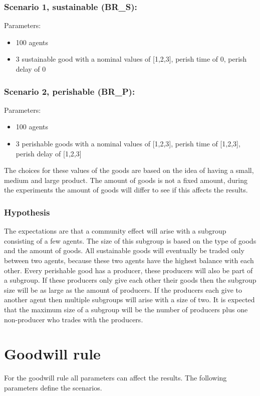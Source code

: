 \documentclass[twoside,openright]{uva-bachelor-thesis}
\begin{document}
\subsubsection{Scenario 1, sustainable (BR\_S):}
Parameters:
\begin{itemize}
\item	100 agents
\item	3 sustainable good with a nominal values of [1,2,3], perish time of 0, perish delay of 0
\end{itemize}
\subsubsection{Scenario 2, perishable (BR\_P):}
Parameters:
\begin{itemize}
\item	100 agents
\item	3 perishable goods with a nominal values of [1,2,3], perish time of [1,2,3], perish delay of [1,2,3]
\end{itemize}
The choices for these values of the goods are based on the idea of having a small, medium and large product. The amount of goods is not a fixed amount, during the experiments the amount of goods will differ to see if this affects the results.

\subsubsection{Hypothesis}
The expectations are that a community effect will arise with a subgroup consisting of a few agents. The size of this subgroup is based on the type of goods and the amount of goods. All sustainable goods will eventually be traded only between two agents, because these two agents have the highest balance with each other. Every perishable good has a producer, these producers will also be part of a subgroup. If these producers only give each other their goods then the subgroup size will be as large as the amount of producers. If the producers each give to another agent then multiple subgroups will arise with a size of two. It is expected that the maximum size of a subgroup will be the number of producers plus one non-producer who trades with the producers.

\section{Goodwill rule}
For the goodwill rule all parameters can affect the results. The following parameters define the scenarios.
\end{document}
